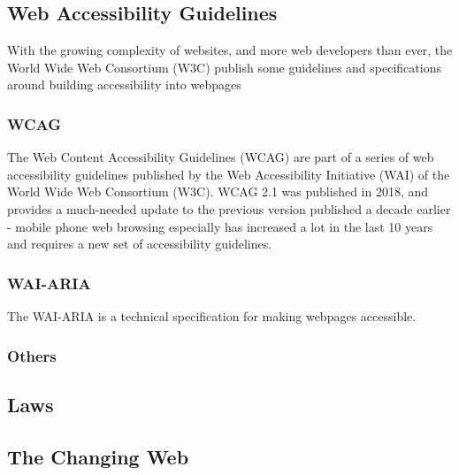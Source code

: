 \documentclass{article}
\begin{document}
\subsection{Web Accessibility Guidelines}
With the growing complexity of websites, and more web developers than ever, the World Wide Web Consortium (W3C) publish some guidelines and specifications around building accessibility into webpages

\subsubsection{WCAG}

The Web Content Accessibility Guidelines (WCAG) \cite{WCAG} are part of a series of web accessibility guidelines published by the Web Accessibility Initiative (WAI) of the World Wide Web Consortium (W3C). WCAG 2.1 was published in 2018, and provides a much-needed update to the previous version published a decade earlier - mobile phone web browsing especially has increased a lot in the last 10 years and requires a new set of accessibility guidelines.


\subsubsection{WAI-ARIA}

The WAI-ARIA \cite{WAIARIA} is a technical specification for making webpages accessible. 

\subsubsection{Others}


\subsection{Laws}


\subsection{The Changing Web}
\end{document}
